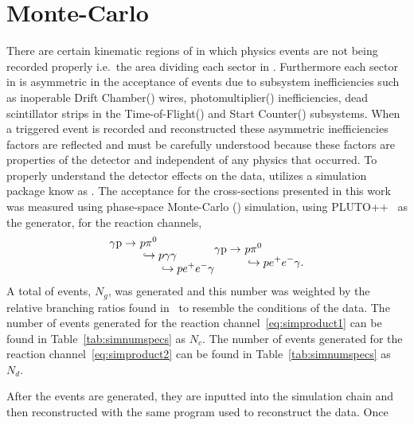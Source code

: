 \section{\label{sec:analysis.simulation}Monte-Carlo}
	There are certain kinematic regions of  in which physics events are not being recorded properly i.e.~the area dividing each sector in . Furthermore 
	each sector in  is asymmetric in the acceptance of events due to subsystem inefficiencies such as inoperable Drift Chamber() wires, 
	photomultiplier() inefficiencies, dead scintillator strips in the Time-of-Flight() and Start Counter() subsystems. When a triggered event is 
	recorded and reconstructed these asymmetric inefficiencies factors are reflected and must be carefully understood because these factors are properties of the  
	detector and independent of any physics that occurred. To properly understand the detector effects on the data,  utilizes a  simulation package 
	know as . 
	The acceptance for the cross-sections presented in this work was measured using phase-space Monte-Carlo (\label{abbr:mc}) simulation, using 
	PLUTO++~\cite{PLUTO} as the generator, for the reaction channels,
	\begin{subequations}
		\begin{align}
			\gamma \p \rightarrow & \ p \pi^{0} \nonumber \\[-0.4em]
			& \ \hookrightarrow p \gamma \gamma \nonumber \\[-0.4em]
			& \qquad \hookrightarrow p e^+ e^- \gamma
			\label{eq:simproduct1}
		\end{align}
		\begin{align}
			\gamma \p \rightarrow & \ p \pi^{0} \nonumber \\[-0.4em]
			& \ \hookrightarrow p e^+ e^- \gamma.
			\label{eq:simproduct2}
		\end{align}
	\end{subequations} 
		A total of events, $N_g$, was generated and this number was weighted by the relative branching ratios found in~\cite{pdg2014} to resemble the conditions of 
		the data. The number of events generated for the reaction channel~\ref{eq:simproduct1} can be found in Table~\ref{tab:simnumspecs} as $N_c$. The number of events 
		generated for the reaction channel~\ref{eq:simproduct2} can be found in Table~\ref{tab:simnumspecs} as $N_d$.
		
		After the events are generated, they are inputted into the  simulation chain and then reconstructed with the same program used to reconstruct the data. Once 
